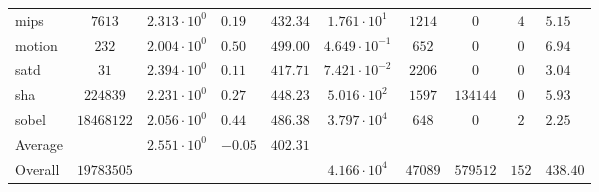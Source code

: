 \begin{tabular}{|l|c|HHc|c|c|c|cH|}
mips          & $ 7613     $ & $ 2.313 \cdot 10^{0} $ & $ 0.19  $ & $ 432.34 $ & $ 1.761 \cdot 10^{1}  $ & $ 1214  $ & $ 0      $ & $ 4   $ & $ 5.15    $ \\
motion        & $ 232      $ & $ 2.004 \cdot 10^{0} $ & $ 0.50  $ & $ 499.00 $ & $ 4.649 \cdot 10^{-1} $ & $ 652   $ & $ 0      $ & $ 0   $ & $ 6.94    $ \\
satd          & $ 31       $ & $ 2.394 \cdot 10^{0} $ & $ 0.11  $ & $ 417.71 $ & $ 7.421 \cdot 10^{-2} $ & $ 2206  $ & $ 0      $ & $ 0   $ & $ 3.04    $ \\
sha           & $ 224839   $ & $ 2.231 \cdot 10^{0} $ & $ 0.27  $ & $ 448.23 $ & $ 5.016 \cdot 10^{2}  $ & $ 1597  $ & $ 134144 $ & $ 0   $ & $ 5.93    $ \\
sobel         & $ 18468122 $ & $ 2.056 \cdot 10^{0} $ & $ 0.44  $ & $ 486.38 $ & $ 3.797 \cdot 10^{4}  $ & $ 648   $ & $ 0      $ & $ 2   $ & $ 2.25    $ \\
\hline
Average       & $          $ & $ 2.551 \cdot 10^{0} $ & $ -0.05 $ & $ 402.31 $ & $                     $ & $       $ & $        $ & $     $ & $         $ \\
\hline
Overall       & $ 19783505 $ & $                    $ & $       $ & $        $ & $ 4.166 \cdot 10^{4}  $ & $ 47089 $ & $ 579512 $ & $ 152 $ & $ 438.40  $ \\
\hline
\end{tabular}
